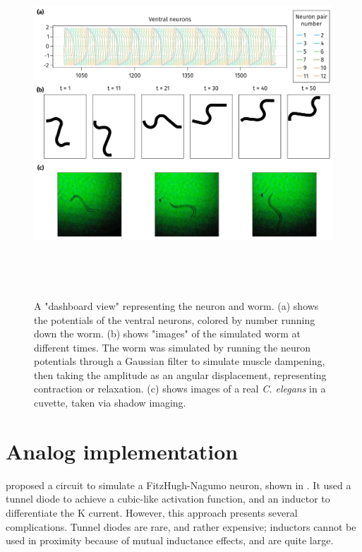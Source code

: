 \documentclass[
    11pt,
]{article}
\begin{document}
\begin{figure}[h!]
    \centering
    \includegraphics[height=13cm]{figures/worm_neuron_dash/worm_neuron_dash.pdf}
    \caption{A "dashboard view" representing the neuron and worm.  (a) shows the potentials of the ventral neurons, colored by number running down the worm.  (b) shows "images" of the simulated worm at different times. The worm was simulated by running the neuron potentials through a Gaussian filter to simulate muscle dampening, then taking the amplitude as an angular displacement, representing contraction or relaxation.  (c) shows images of a real \emph{C. elegans} in a cuvette, taken via shadow imaging.}
    \label{fig: worm_neuron_dash}
\end{figure}


\section{Analog implementation}

\citet{nagumo1962} proposed a circuit to simulate a FitzHugh-Nagumo neuron, shown in .  It used a tunnel diode to achieve a cubic-like activation function, and an inductor to differentiate the K current.  However, this approach presents several complications.  Tunnel diodes are rare, and rather expensive; inductors cannot be used in proximity because of mutual inductance effects, and are quite large.
\end{document}

